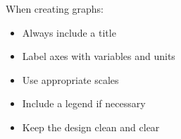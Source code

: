 
When creating graphs:
\begin{itemize}
    \item Always include a title
    \item Label axes with variables and units
    \item Use appropriate scales
    \item Include a legend if necessary
    \item Keep the design clean and clear
\end{itemize}

